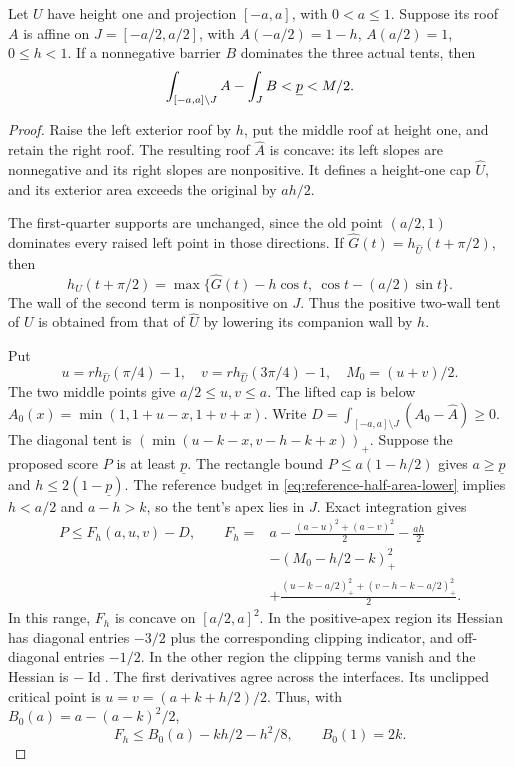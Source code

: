 \begin{lemma}\label{lem:preliminary-short}
Let $U$ have height one and projection $[-a,a]$, with $0<a\le1$.
Suppose its roof $A$ is affine on $J=[-a/2,a/2]$, with
$A(-a/2)=1-h$, $A(a/2)=1$, $0\le h<1$.
If a nonnegative barrier $B$ dominates the three actual tents, then
\[
 \int_{[-a,a]\setminus J}A-\int_JB<\underline p<M/2.
\]
\end{lemma}
\begin{proof}
Raise the left exterior roof by $h$, put the middle roof at height
one, and retain the right roof. The resulting roof $\widehat A$ is
concave: its left slopes are nonnegative and its right slopes are
nonpositive. It defines a height-one cap $\widehat U$, and its
exterior area exceeds the original by $ah/2$.

The first-quarter supports are unchanged, since the old point
$(a/2,1)$ dominates every raised left point in those directions.
If $\widehat G(t)=h_{\widehat U}(t+\pi/2)$, then
\[
 h_U(t+\pi/2)=
 \max\{\widehat G(t)-h\cos t,\ \cos t-(a/2)\sin t\}.
\]
The wall of the second term is nonpositive on $J$. Thus the
positive two-wall tent of $U$ is obtained from that of $\widehat U$
by lowering its companion wall by $h$.

Put
\[
 u=rh_{\widehat U}(\pi/4)-1,\quad
 v=rh_{\widehat U}(3\pi/4)-1,\quad M_0=(u+v)/2.
\]
The two middle points give $a/2\le u,v\le a$. The lifted cap is
below $A_0(x)=\min(1,1+u-x,1+v+x)$. Write
$D=\int_{[-a,a]\setminus J}(A_0-\widehat A)\ge0$.
The diagonal tent is $(\min(u-k-x,v-h-k+x))_+$.
Suppose the proposed score $P$ is at least $\underline p$.
The rectangle bound $P\le a(1-h/2)$ gives $a\ge\underline p$
and $h\le2(1-\underline p)$. The reference budget in
\cref{eq:reference-half-area-lower} implies $h<a/2$ and $a-h>k$,
so the tent's apex lies in $J$. Exact integration gives
\begin{equation}\label{eq:short-relaxation}
 \begin{split}
 P\le F_h(a,u,v)-D,\qquad
 F_h={}&a-\frac{(a-u)^2+(a-v)^2}{2}-\frac{ah}{2}\\
 &-(M_0-h/2-k)_+^2\\
 &+\frac{(u-k-a/2)_+^2+(v-h-k-a/2)_+^2}{2}.
 \end{split}
\end{equation}
In this range, $F_h$ is concave on $[a/2,a]^2$. In the
positive-apex region its Hessian has diagonal entries $-3/2$
plus the corresponding clipping indicator, and off-diagonal
entries $-1/2$. In the other region the clipping terms vanish
and the Hessian is $-\operatorname{Id}$. The first derivatives
agree across the interfaces. Its unclipped critical point is
$u=v=(a+k+h/2)/2$. Thus, with $B_0(a)=a-(a-k)^2/2$,
\begin{equation}\label{eq:short-diagonal-maximum}
 F_h\le B_0(a)-kh/2-h^2/8,\qquad B_0(1)=2k.
\end{equation}


\end{proof}
